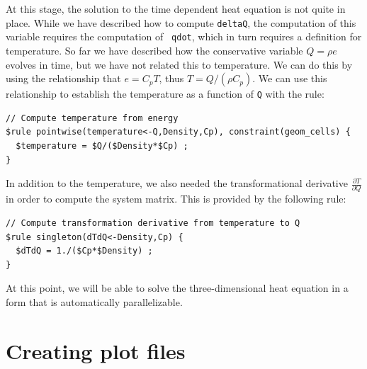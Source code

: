 \documentclass[10pt,epsf,letterpaper,twoside]{book}
\begin{document}
At this stage, the solution to the time dependent heat equation is not
quite in place.  While we have described how to compute {\tt deltaQ},
the computation of this variable requires the computation of {\tt
  qdot}, which in turn requires a definition for {temperature}.  So far
we have described how the conservative variable $Q=\rho e$ evolves in
time, but we have not related this to temperature.  We can do this by
using the relationship that $e = C_p T$, thus $T = Q/(\rho C_p)$.  We
can use this relationship to establish the temperature as a function
of {\tt Q} with the rule:
\begin{verbatim}
// Compute temperature from energy
$rule pointwise(temperature<-Q,Density,Cp), constraint(geom_cells) {
  $temperature = $Q/($Density*$Cp) ;
}
\end{verbatim}
In addition to the temperature, we also needed the transformational
derivative $\frac{\partial T}{\partial Q}$ in order to compute the
system matrix.  This is provided by the following rule:
\newpage
\begin{verbatim}
// Compute transformation derivative from temperature to Q
$rule singleton(dTdQ<-Density,Cp) {
  $dTdQ = 1./($Cp*$Density) ;
}
\end{verbatim}
At this point, we will be able to solve the three-dimensional heat
equation in a form that is automatically parallelizable.

\section{Creating plot files}
\end{document}
